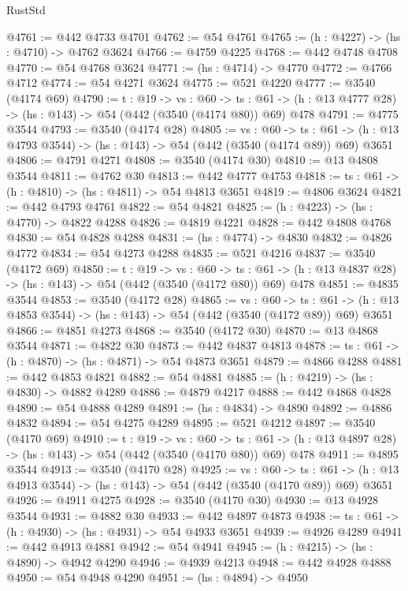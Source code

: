 \begin{lexlean}{RustStd}
\begin{coremodule}
@4761 := @442 @4733 @4701
@4762 := @54 @4761
@4765 := (h : @4227) -> (hs : @4710) -> @4762 @3624
@4766 := @4759 @4225
@4768 := @442 @4748 @4708
@4770 := @54 @4768 @3624
@4771 := (hs : @4714) -> @4770
@4772 := @4766 @4712
@4774 := @54 @4271 @3624
@4775 := @521 @4220
@4777 := @3540 (@4174 @69)
@4790 := {t : @19} ->
  {vs : @60} ->
  {ts : @61} -> (h : @13 @4777 @28) -> (hs : @143) -> @54 (@442 (@3540 (@4174 @80)) @69) @478
@4791 := @4775 @3544
@4793 := @3540 (@4174 @28)
@4805 := {vs : @60} ->
  {ts : @61} -> (h : @13 @4793 @3544) -> (hs : @143) -> @54 (@442 (@3540 (@4174 @89)) @69) @3651
@4806 := @4791 @4271
@4808 := @3540 (@4174 @30)
@4810 := @13 @4808 @3544
@4811 := @4762 @30
@4813 := @442 @4777 @4753
@4818 := {ts : @61} -> (h : @4810) -> (hs : @4811) -> @54 @4813 @3651
@4819 := @4806 @3624
@4821 := @442 @4793 @4761
@4822 := @54 @4821
@4825 := (h : @4223) -> (hs : @4770) -> @4822 @4288
@4826 := @4819 @4221
@4828 := @442 @4808 @4768
@4830 := @54 @4828 @4288
@4831 := (hs : @4774) -> @4830
@4832 := @4826 @4772
@4834 := @54 @4273 @4288
@4835 := @521 @4216
@4837 := @3540 (@4172 @69)
@4850 := {t : @19} ->
  {vs : @60} ->
  {ts : @61} -> (h : @13 @4837 @28) -> (hs : @143) -> @54 (@442 (@3540 (@4172 @80)) @69) @478
@4851 := @4835 @3544
@4853 := @3540 (@4172 @28)
@4865 := {vs : @60} ->
  {ts : @61} -> (h : @13 @4853 @3544) -> (hs : @143) -> @54 (@442 (@3540 (@4172 @89)) @69) @3651
@4866 := @4851 @4273
@4868 := @3540 (@4172 @30)
@4870 := @13 @4868 @3544
@4871 := @4822 @30
@4873 := @442 @4837 @4813
@4878 := {ts : @61} -> (h : @4870) -> (hs : @4871) -> @54 @4873 @3651
@4879 := @4866 @4288
@4881 := @442 @4853 @4821
@4882 := @54 @4881
@4885 := (h : @4219) -> (hs : @4830) -> @4882 @4289
@4886 := @4879 @4217
@4888 := @442 @4868 @4828
@4890 := @54 @4888 @4289
@4891 := (hs : @4834) -> @4890
@4892 := @4886 @4832
@4894 := @54 @4275 @4289
@4895 := @521 @4212
@4897 := @3540 (@4170 @69)
@4910 := {t : @19} ->
  {vs : @60} ->
  {ts : @61} -> (h : @13 @4897 @28) -> (hs : @143) -> @54 (@442 (@3540 (@4170 @80)) @69) @478
@4911 := @4895 @3544
@4913 := @3540 (@4170 @28)
@4925 := {vs : @60} ->
  {ts : @61} -> (h : @13 @4913 @3544) -> (hs : @143) -> @54 (@442 (@3540 (@4170 @89)) @69) @3651
@4926 := @4911 @4275
@4928 := @3540 (@4170 @30)
@4930 := @13 @4928 @3544
@4931 := @4882 @30
@4933 := @442 @4897 @4873
@4938 := {ts : @61} -> (h : @4930) -> (hs : @4931) -> @54 @4933 @3651
@4939 := @4926 @4289
@4941 := @442 @4913 @4881
@4942 := @54 @4941
@4945 := (h : @4215) -> (hs : @4890) -> @4942 @4290
@4946 := @4939 @4213
@4948 := @442 @4928 @4888
@4950 := @54 @4948 @4290
@4951 := (hs : @4894) -> @4950

\end{coremodule}
\end{lexlean}
